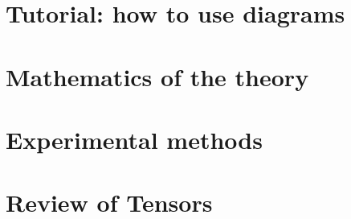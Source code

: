     \section{Tutorial: how to use diagrams}\label{appendix:tutorial}
        
    
    \newpage
    \section{Mathematics of the theory}\label{appendix:math}
        
    
    \newpage
    \section{Experimental methods}\label{appendix:experiments}
        
    
    \newpage
    \section{Review of Tensors}
        


